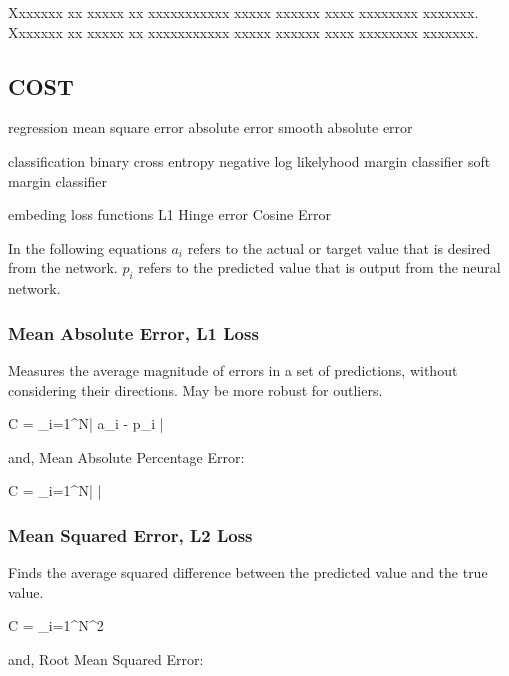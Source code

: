\documentclass{article}
\newcommand{\GPM}[1]{\left| {#1} \right|}
\newcommand{\SUMNP}[3]{\displaystyle\sum_{#1}^{#2}\GPP{#3}}
\newcommand{\SUMNM}[3]{\displaystyle\sum_{#1}^{#2}\GPM{#3}}
\begin{document}
Xxxxxxx xx xxxxx xx xxxxxxxxxxx xxxxx xxxxxx xxxx xxxxxxxx xxxxxxx.
Xxxxxxx xx xxxxx xx xxxxxxxxxxx xxxxx xxxxxx xxxx xxxxxxxx xxxxxxx.

\subsection{COST}

regression
mean square error
absolute error
smooth absolute error

classification
binary cross entropy
negative log likelyhood
margin classifier
soft margin classifier

embeding loss functions
L1 Hinge error
Cosine Error


In the following equations
$a_i$ refers to the actual or target value that is desired from the network.
$p_i$ refers to the predicted value that is output from the neural network.

\subsubsection{Mean Absolute Error, L1 Loss}
Measures the average magnitude of errors in a set of predictions, without considering their directions. May be more robust for outliers.

\begin{tcequation}
  C =  \SUMNM{i=1}{N}{a_i - p_i}
\end{tcequation}

and, Mean Absolute Percentage Error:

\begin{tcequation}
  C =  \SUMNM{i=1}{N}{}
\end{tcequation}

\subsubsection{Mean Squared Error, L2 Loss}
Finds the average squared difference between the predicted value and the true value.

\begin{tcequation}
  C =  \SUMNP{i=1}{N}{a_i - p_i}^2
\end{tcequation}

and, Root Mean Squared Error:
\end{document}
